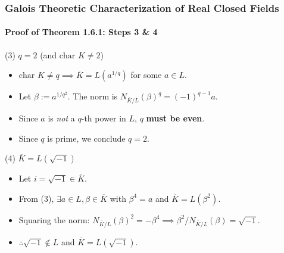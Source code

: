 \documentclass[11pt]{beamer}
\begin{document}
\begin{frame}
    \frametitle{Galois Theoretic Characterization of Real Closed Fields}
    \framesubtitle{Proof of Theorem 1.6.1: Steps 3 \& 4}

    \begin{block}{(3) $q = 2$ (and $\text{char } K \neq 2$)}
        \begin{itemize}
            \item $\text{char } K \neq q \implies \overline{K} = L(a^{1/q})$ for some $a \in L$.
            \item Let $\beta := a^{1/q^2}$. The norm is $N_{\overline{K}/L}(\beta)^q = (-1)^{q-1}a$.
            \item Since $a$ is \emph{not} a $q$-th power in $L$, $q$ \textbf{must be even}.
            \item Since $q$ is prime, we conclude $q = 2$.
        \end{itemize}
    \end{block}

    \begin{block}{(4) $\overline{K} = L(\sqrt{-1})$}
        \begin{itemize}
            \item Let $i = \sqrt{-1} \in \overline{K}$.
            \item From (3), $\exists a \in L, \beta \in \overline{K}$ with $\beta^4 = a$ and $\overline{K} = L(\beta^2)$.
            \item Squaring the norm: $N_{\overline{K}/L}(\beta)^2 = -\beta^4 \implies \beta^2 / N_{\overline{K}/L}(\beta) = \sqrt{-1}$.
            \item $\therefore \sqrt{-1} \notin L$ and $\overline{K} = L(\sqrt{-1})$.
        \end{itemize}
    \end{block}
\end{frame}
\end{document}
